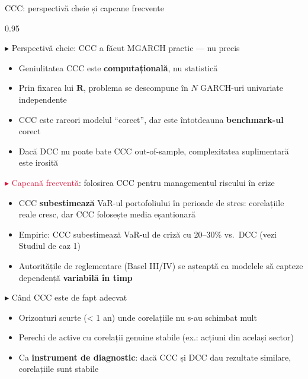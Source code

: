 \documentclass[9pt, aspectratio=169, t]{beamer}
\begin{document}
\begin{frame}{CCC: perspectivă cheie și capcane frecvente}
    \begin{cminipage}{0.95\textwidth}
    \vspace{-3mm}
    {\scriptsize
    \begin{block}{\textcolor{MainBlue}{$\blacktriangleright$ Perspectivă cheie}: CCC a făcut MGARCH practic --- nu precis}
        \begin{itemize}\setlength{\itemsep}{0pt}
            \item Geniulitatea CCC este \textbf{computațională}, nu statistică
            \item Prin fixarea lui $\mathbf{R}$, problema se descompune în $N$ GARCH-uri univariate independente
            \item CCC este rareori modelul ``corect'', dar este întotdeauna \textbf{benchmark-ul} corect
            \item Dacă DCC nu poate bate CCC out-of-sample, complexitatea suplimentară este irosită
        \end{itemize}
    \end{block}
    \vspace{-2mm}
    \begin{alertblock}{\textcolor{Crimson}{$\blacktriangleright$ Capcană frecventă}: folosirea CCC pentru managementul riscului în crize}
        \begin{itemize}\setlength{\itemsep}{0pt}
            \item CCC \textbf{subestimează} VaR-ul portofoliului în perioade de stres: corelațiile reale cresc, dar CCC folosește media eșantionară
            \item Empiric: CCC subestimează VaR-ul de criză cu 20--30\% vs.\ DCC (vezi Studiul de caz 1)
            \item Autoritățile de reglementare (Basel III/IV) se așteaptă ca modelele să capteze dependență \textbf{variabilă în timp}
        \end{itemize}
    \end{alertblock}
    \vspace{-2mm}
    \begin{exampleblock}{\textcolor{Forest}{$\blacktriangleright$ Când CCC este de fapt adecvat}}
        \begin{itemize}\setlength{\itemsep}{0pt}
            \item Orizonturi scurte (< 1 an) unde corelațiile nu s-au schimbat mult
            \item Perechi de active cu corelații genuine stabile (ex.: acțiuni din același sector)
            \item Ca \textbf{instrument de diagnostic}: dacă CCC și DCC dau rezultate similare, corelațiile sunt stabile
        \end{itemize}
    \end{exampleblock}
    }
    \end{cminipage}
\end{frame}
\end{document}
